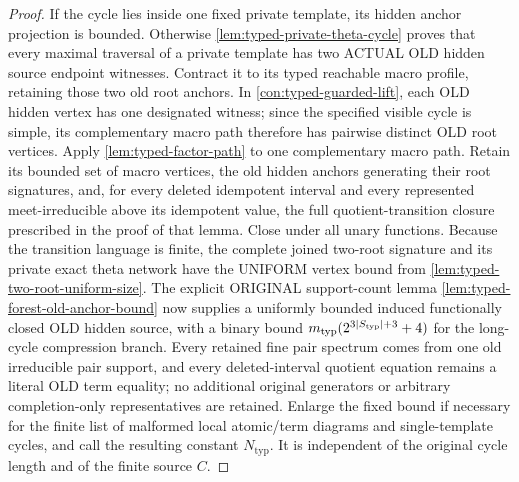 \begin{proof}
If the cycle lies inside one fixed private template, its hidden anchor
projection is bounded.  Otherwise \cref{lem:typed-private-theta-cycle}
proves that every maximal traversal of a
private template has two ACTUAL OLD hidden
source endpoint witnesses. Contract it
to its typed reachable macro profile,
retaining those two old root anchors. In
\cref{con:typed-guarded-lift}, each OLD hidden vertex has one designated
witness; since the specified visible cycle is simple, its complementary
macro path therefore has pairwise distinct OLD root vertices.
Apply \cref{lem:typed-factor-path}
to one complementary macro path.  Retain its
bounded set of macro vertices, the old hidden anchors generating their root
signatures, and, for every deleted idempotent interval and every represented
meet-irreducible above its idempotent value, the full quotient-transition
closure prescribed in the proof of that lemma.  Close under all unary
functions.  Because the transition language is
finite, the complete joined
two-root signature and its
private exact theta network
have the UNIFORM vertex
bound from
\cref{lem:typed-two-root-uniform-size}.
The explicit ORIGINAL
support-count lemma
\cref{lem:typed-forest-old-anchor-bound}
now supplies a uniformly
bounded induced
functionally closed OLD
hidden source, with a
binary bound
\(m_{\mathrm{typ}}
(2^{3|S_{\rm typ}|+3}+4)\)
for the long-cycle
compression branch.
Every retained fine pair
spectrum comes from one
old irreducible pair support,
and every deleted-interval
quotient equation remains
a literal OLD term equality;
no additional original
generators or arbitrary
completion-only
representatives are retained.
Enlarge the fixed bound
if necessary for the
finite list of malformed
local atomic/term diagrams
and single-template cycles,
and call the resulting
constant \(N_{\mathrm{typ}}\).
It is independent of the
original cycle length
and of the finite source
\(C\).


\end{proof}
